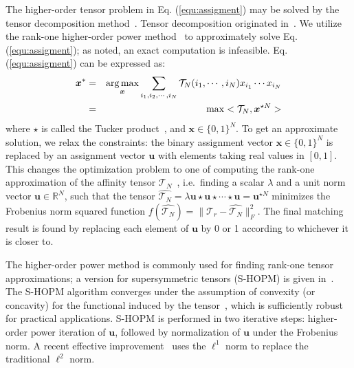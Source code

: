The higher-order tensor problem in Eq. (\ref{equ:assigment}) may be solved by the tensor decomposition method~\cite{Kolda08}.
Tensor decomposition originated in~\cite{Hitchcock27}.
We utilize the rank-one higher-order power method~\cite{Lathauwer95} to approximately solve  Eq. (\ref{equ:assigment}); as noted, an exact computation is infeasible.
Eq. (\ref{equ:assigment}) can be expressed as:
\begin{eqnarray}
\label{equ:assigment2}
{\boldsymbol{x}}^* &=& \operatorname*{arg\,max}_{\boldsymbol{x}} \sum_{i_1,i_2,\cdots,i_N} \mathcal{T}_N(i_1,\cdots,i_N) x_{i_1} \cdots x_{i_N} \nonumber\\
&=& \max <\mathcal{T}_N, \boldsymbol{x}^{\star N}>
\end{eqnarray}
where $\star$ is called the Tucker product~\cite{Kofidis02}, and $\boldsymbol{x} \in \{0,1\}^{N}$.
To get an approximate solution, we relax the constraints:
the binary assignment vector $\boldsymbol{x}\in \{0,1\}^{N}$ is replaced by an assignment vector $\boldsymbol{u}$ with elements taking real values in $[0,1]$.
This changes the optimization problem to one of computing the rank-one approximation of the affinity tensor $\mathcal{T}_N$~\cite{Kofidis02},
i.e.\ finding a scalar $\lambda$ and a unit norm vector $\boldsymbol{u}\in \mathbb{R}^{N}$,
such that the tensor $\hat{\mathcal{T}_N} = \lambda \boldsymbol{u}\star \boldsymbol{u} \star\cdots \star \boldsymbol{u}=\boldsymbol{u}^{\star N}$ minimizes the Frobenius norm squared function $f(\hat{\mathcal{T}_N})=\lVert \mathcal{T}_r-\hat{\mathcal{T}_N} \lVert^2_F$.
The final matching result is found by replacing each element of $\boldsymbol{u}$ by 0 or 1 according to whichever it is closer to.

The higher-order power method is commonly used for finding rank-one tensor approximations;
a version for supersymmetric tensors (S-HOPM) is given in~\cite{Kofidis02}.
The S-HOPM algorithm converges under the assumption of convexity (or concavity) for the functional induced by the tensor~\cite{Kofidis02},
which is sufficiently robust for practical applications.
S-HOPM is performed in two iterative steps: higher-order power iteration of $\boldsymbol{u}$, followed by normalization of $\boldsymbol{u}$ under the Frobenius norm.
A recent effective improvement~\cite{Duchenne09} uses the $\mathcal{\ell}^1$ norm to replace the traditional $\mathcal{\ell}^2$ norm.

